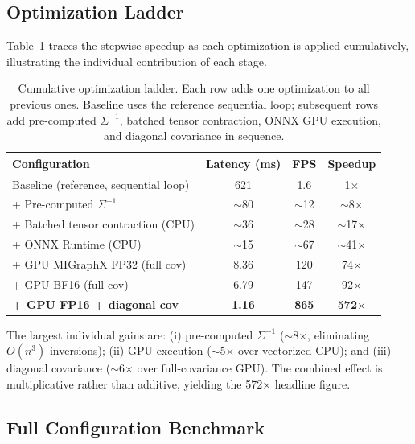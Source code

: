 \documentclass[blind]{gtac}
\begin{document}
\subsection{Optimization Ladder}

Table~\ref{tab:ladder} traces the stepwise speedup as each optimization is
applied cumulatively, illustrating the individual contribution of each stage.

\begin{table}[H]
\centering
\caption{Cumulative optimization ladder.  Each row adds one optimization to all
previous ones.  Baseline uses the reference sequential loop; subsequent rows add
pre-computed $\Sigma^{-1}$, batched tensor contraction, ONNX GPU execution,
and diagonal covariance in sequence.}
\label{tab:ladder}
\footnotesize
\begin{tabular}{@{}p{2.15in}ccc@{}}
\toprule
Configuration & Latency (ms) & FPS & Speedup \\
\midrule
Baseline (reference, sequential loop)   & 621   & 1.6  & 1$\times$       \\
+ Pre-computed $\Sigma^{-1}$            & $\sim$80  & $\sim$12  & $\sim$8$\times$  \\
+ Batched tensor contraction (CPU)      & $\sim$36  & $\sim$28  & $\sim$17$\times$ \\
+ ONNX Runtime (CPU)                    & $\sim$15  & $\sim$67  & $\sim$41$\times$ \\
+ GPU MIGraphX FP32 (full cov)          & 8.36  & 120  & 74$\times$      \\
+ GPU BF16  (full cov)                  & 6.79  & 147  & 92$\times$      \\
\textbf{+ GPU FP16 + diagonal cov}      & \textbf{1.16}  & \textbf{865}  & \textbf{572$\times$} \\
\bottomrule
\end{tabular}
\end{table}

The largest individual gains are: (i) pre-computed $\Sigma^{-1}$ ($\sim$8$\times$,
eliminating $O(n^3)$ inversions); (ii) GPU execution ($\sim$5$\times$ over
vectorized CPU); and (iii) diagonal covariance ($\sim$6$\times$ over full-covariance
GPU).  The combined effect is multiplicative rather than additive, yielding the
572$\times$ headline figure.

\subsection{Full Configuration Benchmark}
\end{document}
